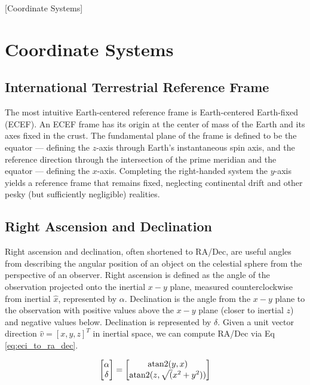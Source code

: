 [Coordinate Systems]
\graphicspath{{/Users/liamrobinson/Documents/PyLightCurves/docs/build/html/_images}}

\section{Coordinate Systems}

\subsection{International Terrestrial Reference Frame}

The most intuitive Earth-centered reference frame is Earth-centered Earth-fixed (ECEF). An ECEF
frame has its origin at the center of mass of the Earth and its axes fixed in the crust. The
fundamental plane of the frame is defined to be the equator ---  defining the $z$-axis through Earth's
instantaneous spin axis, and the reference direction through the intersection of the prime meridian
and the equator ---  defining the $x$-axis. Completing the right-handed system the $y$-axis yields a
reference frame that remains fixed, neglecting continental drift and other pesky (but sufficiently
negligible) realities. 

\subsection{Right Ascension and Declination}

Right ascension and declination, often shortened to RA/Dec, are useful angles from describing the angular position of an object
on the celestial sphere from the perspective of an observer. Right ascension is defined as the angle
of the observation projected onto the inertial $x-y$ plane, measured counterclockwise from inertial
$\hat{x}$, represented by $\alpha$. Declination is the angle from the $x-y$ plane to the observation
with positive values above the $x-y$ plane (closer to inertial $z$) and negative values below.
Declination is represented by $\delta$. Given a unit vector direction $\hat{v} = \left[ x, y, z \right]^T$ in
inertial space, we can compute RA/Dec via Eq \ref{eq:eci_to_ra_dec}.

\begin{equation} \label{eq:eci_to_ra_dec}
  \begin{bmatrix}
	\alpha \\
	\delta
  \end{bmatrix} = 
  \begin{bmatrix}
	\operatorname{atan2}(y, x) \\
	\operatorname{atan2}(z, \sqrt(x^2 + y^2))
  \end{bmatrix}
\end{equation}

